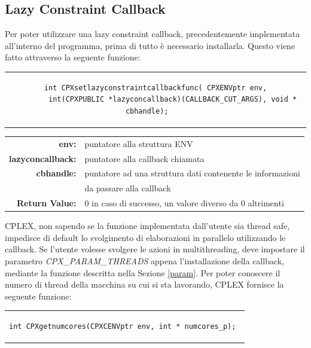 \subsection{Lazy Constraint Callback}
Per poter utilizzare una lazy constraint callback, precedentemente implementata all'interno del programma, prima di tutto è necessario installarla. Questo viene fatto attraverso la seguente funzione:
\begin{center}
\begin{tabular}{c}
\begin{lstlisting}[linewidth=385pt, basicstyle=\footnotesize\sffamily,] 
int CPXsetlazyconstraintcallbackfunc( CPXENVptr env,
		int(CPXPUBLIC *lazyconcallback)(CALLBACK_CUT_ARGS), void * cbhandle);    
\end{lstlisting}
\end{tabular}
\end{center}
\begin{table}[h]
\centering
\begin{tabular}{rl}
\textbf{env:} & {puntatore alla struttura ENV}\\
\textbf{lazyconcallback:} & {puntatore alla callback chiamata}\\
\textbf{cbhandle:} & {puntatore ad una struttura dati contenente le informazioni}\\
& {da passare alla callback}\\
\textbf{Return Value:} & {0 in caso di successo, un valore diverso da 0 altrimenti}\\
\end{tabular}
\end{table}
CPLEX, non sapendo se la funzione implementata dall'utente sia thread safe, impedisce di default lo svolgimento di elaborazioni in parallelo utilizzando le callback. Se l'utente volesse svolgere le azioni in multithreading, deve impostare il parametro \textit{CPX\_PARAM\_THREADS} appena l'installazione della callback, mediante la funzione descritta nella Sezione \ref{param}. Per poter conoscere il numero di thread della macchina su cui si sta lavorando, CPLEX fornisce la seguente funzione:\\
\begin{center}
\begin{tabular}{c}
\begin{lstlisting}[linewidth=280pt, basicstyle=\footnotesize\sffamily,]
int CPXgetnumcores(CPXCENVptr env, int * numcores_p); 
\end{lstlisting}
\end{tabular}
\end{center}
